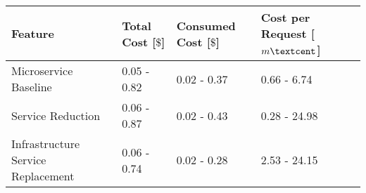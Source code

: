 \begin{tabular}{llll}
\toprule
Feature & Total Cost [$\$$] & Consumed Cost [$\$$] & Cost per Request [$m\textcent$] \\
\midrule
Microservice Baseline & 0.05 - 0.82 & 0.02 - 0.37 & 0.66 - 6.74 \\
Service Reduction & 0.06 - 0.87 & 0.02 - 0.43 & 0.28 - 24.98 \\
Infrastructure Service Replacement & 0.06 - 0.74 & 0.02 - 0.28 & 2.53 - 24.15 \\
\bottomrule
\end{tabular}

